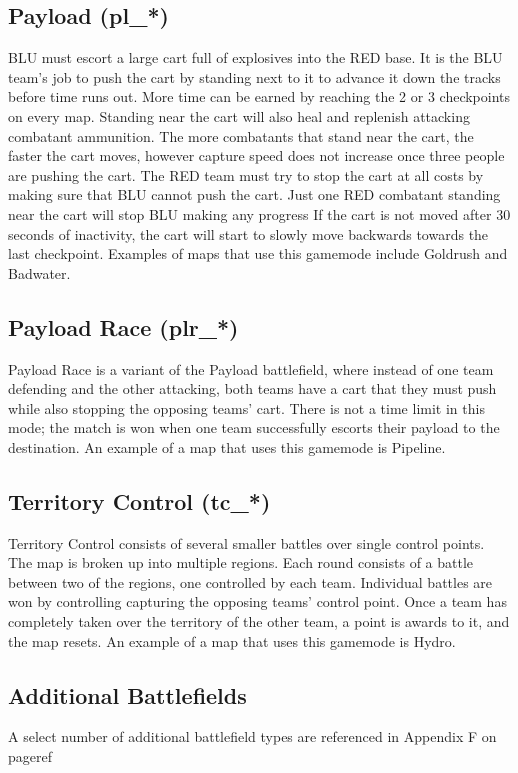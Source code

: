 \subsection{Payload (pl\_*)}
BLU must escort a large cart full of explosives into the RED base. It is the BLU team's job to push the cart by standing next to it to advance it down the tracks before time runs out. More time can be earned by reaching the 2 or 3 checkpoints on every map. Standing near the cart will also heal and replenish attacking combatant ammunition. The more combatants that stand near the cart, the faster the cart moves, however capture speed does not increase once three people are pushing the cart. The RED team must try to stop the cart at all costs by making sure that BLU cannot push the cart. Just one RED combatant standing near the cart will stop BLU making any progress If the cart is not moved after 30 seconds of inactivity, the cart will start to slowly move backwards towards the last checkpoint. Examples of maps that use this gamemode include Goldrush and Badwater.

\subsection{Payload Race (plr\_*)}
Payload Race is a variant of the Payload battlefield, where instead of one team defending and the other attacking, both teams have a cart that they must push while also stopping the opposing teams’ cart. There is not a time limit in this mode; the match is won when one team successfully escorts their payload to the destination. An example of a map that uses this gamemode is Pipeline.

\subsection{Territory Control (tc\_*)}
Territory Control consists of several smaller battles over single control points.  The map is broken up into multiple regions.  Each round consists of a battle between two of the regions, one controlled by each team. Individual battles are won by controlling capturing the opposing teams' control point.  Once a team has completely taken over the territory of the other team, a point is awards to it, and the map resets. An example of a map that uses this gamemode is Hydro.

\subsection{Additional Battlefields}
A select number of additional battlefield types are referenced in Appendix F on {{pageref}}
